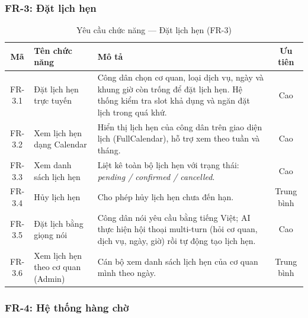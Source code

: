 \subsubsection{FR-3: Đặt lịch hẹn}

\begin{table}[H]
\centering
\caption{Yêu cầu chức năng — Đặt lịch hẹn (FR-3)}
\label{tab:fr-appointment}
\begin{tabularx}{\textwidth}{|c|l|X|c|}
\hline
\textbf{Mã} & \textbf{Tên chức năng} & \textbf{Mô tả} & \textbf{Ưu tiên} \\
\hline
FR-3.1 & Đặt lịch hẹn trực tuyến &
  Công dân chọn cơ quan, loại dịch vụ, ngày và khung giờ còn trống để
  đặt lịch hẹn. Hệ thống kiểm tra slot khả dụng và ngăn đặt lịch trong quá khứ. &
  Cao \\
\hline
FR-3.2 & Xem lịch hẹn dạng Calendar &
  Hiển thị lịch hẹn của công dân trên giao diện lịch (FullCalendar),
  hỗ trợ xem theo tuần và tháng. &
  Cao \\
\hline
FR-3.3 & Xem danh sách lịch hẹn &
  Liệt kê toàn bộ lịch hẹn với trạng thái: \textit{pending / confirmed / cancelled}. &
  Cao \\
\hline
FR-3.4 & Hủy lịch hẹn &
  Cho phép hủy lịch hẹn chưa đến hạn. &
  Trung bình \\
\hline
FR-3.5 & Đặt lịch bằng giọng nói &
  Công dân nói yêu cầu bằng tiếng Việt; AI thực hiện hội thoại
  multi-turn (hỏi cơ quan, dịch vụ, ngày, giờ) rồi tự động tạo lịch hẹn. &
  Cao \\
\hline
FR-3.6 & Xem lịch hẹn theo cơ quan (Admin) &
  Cán bộ xem danh sách lịch hẹn của cơ quan mình theo ngày. &
  Trung bình \\
\hline
\end{tabularx}
\end{table}

\subsubsection{FR-4: Hệ thống hàng chờ}

